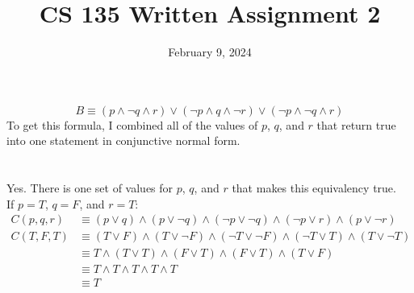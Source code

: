 \documentclass[draft]{article}
\title{CS 135 Written Assignment 2}
\date{February 9, 2024}
\begin{document}
\maketitle

\section{}
\begin{equation*}
	B \equiv (p \land \neg q \land r) \lor (\neg p \land q \land \neg r) \lor (\neg p \land \neg q \land r)
\end{equation*}
To get this formula, I combined all of the values of $p$, $q$, and $r$ that return true into one statement in conjunctive normal form.

\section{}
\subsection{}
Yes. There is one set of values for $p$, $q$, and $r$ that makes this equivalency true. \\
If $p=T$, $q=F$, and $r=T$:
\begin{align*}
	C(p, q, r) & \equiv (p \lor q) \land (p \lor \neg q) \land ( \neg p \lor \neg q) \land ( \neg p \lor r) \land (p \lor \neg r) \\
	C(T, F, T) & \equiv (T \lor F) \land (T \lor \neg F) \land ( \neg T \lor \neg F) \land ( \neg T \lor T) \land (T \lor \neg T) \\
	           & \equiv T \land (T \lor T) \land (F \lor T) \land ( F \lor T) \land (T \lor F) \\
	           & \equiv T \land T \land T \land T \land T \\
	           & \equiv T
\end{align*}
\end{document}
